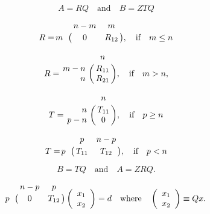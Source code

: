 {\newpage\clearpage
{}%
\begin{displaymath}
A = R Q \quad \mbox{and} \quad B = Z T Q
\end{displaymath}%
\lthtmldisplayZ
\lthtmlcheckvsize\clearpage}

{\newpage\clearpage
{}%
\begin{displaymath}
R = \bordermatrix{    & n-m    &   m    \cr
                  m   & 0      &  R_{12}  }, \quad \mbox{if} \quad m \leq n
\end{displaymath}%
\lthtmldisplayZ
\lthtmlcheckvsize\clearpage}

{\newpage\clearpage
{}%
\begin{displaymath}
R = \bordermatrix{    & n   \cr
                  m-n & R_{11} \cr
         \hfill   n   & R_{21} },   \quad \mbox{if} \quad m > n,
\end{displaymath}%
\lthtmldisplayZ
\lthtmlcheckvsize\clearpage}

{\newpage\clearpage
{}%
\begin{displaymath}
T = \bordermatrix{    & n   \cr
         \hfill   n   & T_{11} \cr
                  p-n & 0      }, \quad \mbox{if} \quad p \geq n
\end{displaymath}%
\lthtmldisplayZ
\lthtmlcheckvsize\clearpage}

{\newpage\clearpage
{}%
\begin{displaymath}
T = \bordermatrix{    & p      &  n-p    \cr
                  p   & T_{11} &  T_{12} }, \quad \mbox{if} \quad p < n
\end{displaymath}%
\lthtmldisplayZ
\lthtmlcheckvsize\clearpage}

{\newpage\clearpage
{}%
\begin{displaymath}
B = T Q \quad \mbox{and} \quad A = Z R Q.
\end{displaymath}%
\lthtmldisplayZ
\lthtmlcheckvsize\clearpage}

{\newpage\clearpage
{}%
\begin{displaymath}
\bordermatrix{    & n-p    &   p    \cr
              p   & 0      &  T_{12}  }
\left( \begin{array}{c} x_1 \\x_2 \end{array} \right) = d   \quad
\mbox{where}  \quad \left( \begin{array}{c} x_1 \\x_2 \end{array} \right) \equiv Q x.
\end{displaymath}%
\lthtmldisplayZ
\lthtmlcheckvsize\clearpage}

